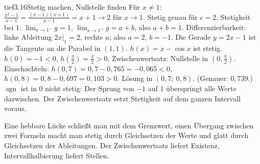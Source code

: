 \begin{loesungkarte}{tief}{3.16}{Stetig machen, Nullstelle finden}
Für $x\neq1$: $\frac{x^{2} - 1}{x - 1} = \frac{(x - 1)(x + 1)}{x - 1} = x + 1\to2$ für $x\to1$. Stetig genau für $c = 2$.
Stetigkeit bei $1$: $\lim_{x\to1^{-}}g = 1$, $\lim_{x\to1^{+}}g = a + b$, also $a + b = 1$. Differenzierbarkeit: linke Ableitung $2x|_{1} = 2$, rechte $a$; also $a = 2$, $b = -1$. Die Gerade $y = 2x - 1$ ist die Tangente an die Parabel in $(1, 1)$.
$h(x) = x - \cos x$ ist stetig. $h(0) = -1 < 0$, $h(\frac\pi2) = \frac\pi2 > 0$. Zwischenwertsatz: Nullstelle in $(0, \frac\pi2)$. Einschachteln: $h(0{,}7) = 0{,}7 - 0{,}765 = -0{,}065 < 0$, $h(0{,}8) = 0{,}8 - 0{,}697 = 0{,}103 > 0$. Lösung in $(0{,}7;\ 0{,}8)$. (Genauer: $0{,}739$.)
$\operatorname{sgn}$ ist in $0$ nicht stetig: Der Sprung von $-1$ auf $1$ überspringt alle Werte dazwischen. Der Zwischenwertsatz setzt Stetigkeit auf dem ganzen Intervall voraus.
\begin{mitnehmen}\kastentext
Eine hebbare Lücke schließt man mit dem Grenzwert, einen Übergang zwischen zwei Formeln macht man stetig durch Gleichsetzen der Werte und glatt durch Gleichsetzen der Ableitungen. Der Zwischenwertsatz liefert Existenz, Intervallhalbierung liefert Stellen.
\end{mitnehmen}
\end{loesungkarte}

